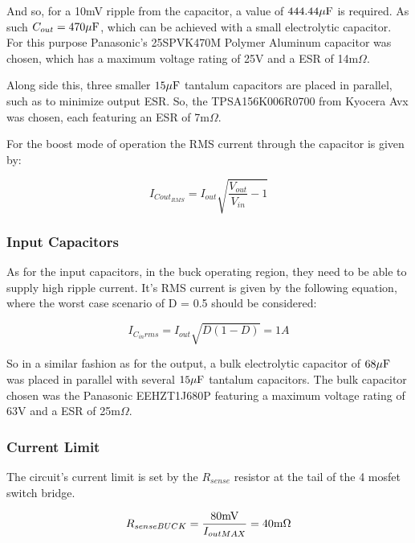 \documentclass[11pt, a4paper]{article}
\begin{document}
And so, for a 10mV ripple from the capacitor, a value of $444.44\mu \text F$ is required. As such $C_{out} = 470\mu \text F$, which can be achieved with a small electrolytic capacitor. For this purpose Panasonic's 25SPVK470M Polymer Aluminum capacitor was chosen, which has a maximum voltage rating of 25V and a ESR of 14m$\Omega$.

Along side this, three smaller $15\mu \text F$ tantalum capacitors are placed in parallel, such as to minimize output ESR. So, the TPSA156K006R0700 from Kyocera Avx was chosen, each featuring an ESR of 7m$\Omega$. 

For the boost mode of operation the RMS current through the capacitor is given by:

\begin{equation}
    I_{Cout_{RMS}} = I_{out} \sqrt{\frac{V_{out}}{V_{in}}-1}
    \label{eq:coutIrms}
\end{equation}

\subsubsection{Input Capacitors}

As for the input capacitors, in the buck operating region, they need to be able to supply high ripple current. It's RMS current is given by the following equation, where the worst case scenario of D = 0.5 should be considered:

\begin{equation}
    I_{C_{in}rms} = I_{out} \sqrt{D(1-D)} = 1 A
    \label{eq:cinIrms}
\end{equation}

So in a similar fashion as for the output, a bulk electrolytic capacitor of $68\mu \text F$ was placed in parallel with several $15\mu \text F$ tantalum capacitors. The bulk capacitor chosen was the Panasonic EEHZT1J680P featuring a maximum voltage rating of 63V and a ESR of 25m$\Omega$.

\subsubsection{Current Limit}

The circuit's current limit is set by the $R_{sense}$ resistor at the tail of the 4 mosfet switch bridge.

\begin{equation}
    R_{senseBUCK} = \frac{80\text{mV}}{I_{outMAX}} = 40\text m\Omega
\end{equation}
\end{document}
